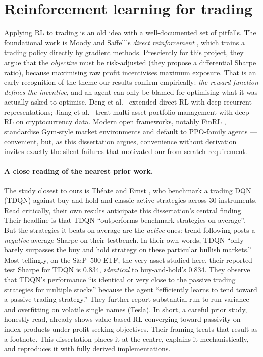 \section{Reinforcement learning for trading}
\label{sec:bg_trading}

Applying RL to trading is an old idea with a well-documented set of
pitfalls. The foundational work is Moody and Saffell's \emph{direct
reinforcement} \cite{moody2001}, which trains a trading policy directly
by gradient methods. Presciently for this project, they argue that the
\emph{objective} must be risk-adjusted (they propose a differential
Sharpe ratio), because maximising raw profit incentivises maximum
exposure. That is an early recognition of the theme our results confirm
empirically: \emph{the reward function defines the incentive}, and an
agent can only be blamed for optimising what it was actually asked to
optimise. Deng et al.\ \cite{deng2017} extended direct RL with deep
recurrent representations; Jiang et al.\ \cite{jiang2017} treat
multi-asset portfolio management with deep RL on cryptocurrency data.
Modern open frameworks, notably FinRL \cite{liu2020finrl}, standardise
Gym-style market environments and default to PPO-family agents ---
convenient, but, as this dissertation argues, convenience without
derivation invites exactly the silent failures that motivated our
from-scratch requirement.

\paragraph{A close reading of the nearest prior work.} The study closest
to ours is Th\'eate and Ernst \cite{theate2021}, who benchmark a trading
DQN (TDQN) against buy-and-hold and classic active strategies across 30
instruments. Read critically, their own results anticipate this
dissertation's central finding. Their headline is that TDQN
``outperforms benchmark strategies on average''. But the strategies it
beats on average are the \emph{active} ones: trend-following posts a
\emph{negative} average Sharpe on their testbench. In their own words,
TDQN ``only barely surpasses the buy and hold strategy on these
particular bullish markets.'' Most tellingly, on the S\&P~500 ETF, the
very asset studied here, their reported test Sharpe for TDQN is 0.834,
\emph{identical} to buy-and-hold's 0.834. They observe that TDQN's
performance ``is identical or very close to the passive trading
strategies for multiple stocks'' because the agent ``efficiently learns
to tend toward a passive trading strategy.'' They further report
substantial run-to-run variance and overfitting on volatile single names
(Tesla). In short, a careful prior study, honestly read, already shows
value-based RL converging toward passivity on index products under
profit-seeking objectives. Their framing treats that result as a
footnote. This dissertation places it at the centre, explains it
mechanistically, and reproduces it with fully derived implementations.

